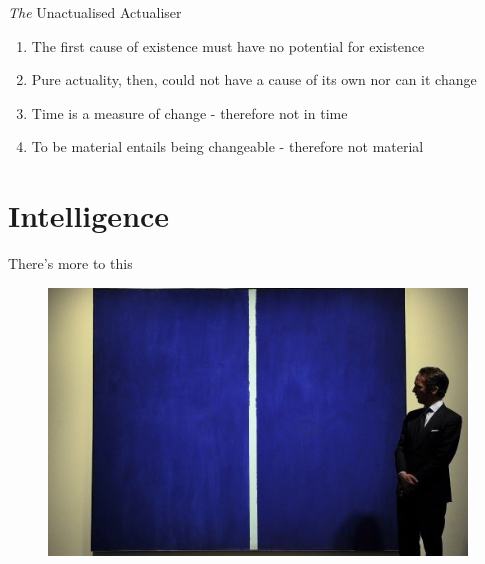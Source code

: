 \documentclass[xcolor=dvipsnames]{beamer}
\begin{document}
\begin{frame}[fragile]{\emph{The} Unactualised Actualiser}
  \begin{enumerate}
  \item The first cause of existence must have no potential for existence \vspace{5mm}
  \item Pure actuality, then, could not have a cause of its own nor can it change \vspace{5mm}
  \item Time is a measure of change - therefore not in time \vspace{5mm}
  \item To be material entails being changeable - therefore not material \vspace{5mm}
  \end{enumerate}
\end{frame}


\section{Intelligence}


\begin{frame}{There's more to this}
\begin{figure}
  \centering
  \begin{columns}
    \centering
    \includegraphics[width=0.99\textwidth]{abstract}
  \end{columns}
\end{figure}
\end{frame}
\end{document}
